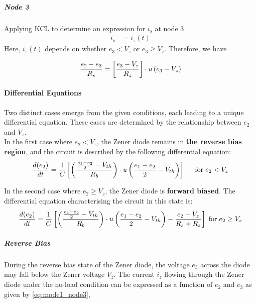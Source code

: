 \subparagraph{Node \textcircled{3}}
Applying KCL to determine an expression for $i_s$ at node \textcircled{3}
\begin{equation}
    \begin{split}
        i_s &= i_z(t)
    \end{split}
\end{equation}
Here, \(i_z(t)\) depends on whether \(e_3 < V_z\) or \(e_3 \geq V_z\). Therefore, we have

\begin{equation}
    \frac{e_2 - e_3}{R_s} = \left[\frac{e_3 - V_z}{R_z} \right]\cdot u\left(e_3 - V_z \right)
    \label{eq:mode1_node3}
\end{equation}

\paragraph{Differential Equations}
Two distinct cases emerge from the given conditions, each leading to a unique differential equation. These cases are determined by the relationship between \(e_2\) and \(V_z\).\\

In the first case where \(e_2 < V_z\), the Zener diode remains in \textbf{the reverse bias region}, and the circuit is described by the following differential equation:
\begin{equation}
    \frac{d(e_2)}{dt}=\frac{1}{C} \left[\left(\frac{\frac{e_1 - e_2}{2} - V_{th}}{R_b} \right) \cdot u\left(\frac{e_1-e_2}{2}-V_{th} \right) \right] \hspace{0.5cm} \text{for} \hspace{0.1cm} e_2 < V_z
\end{equation}

In the second case where \(e_2 \geq V_z\), the Zener diode is \textbf{forward biased}. The differential equation characterising the circuit in this state is:
\begin{equation}
   \frac{d(e_2)}{dt}=\frac{1}{C}\left[\left(\frac{\frac{e_1 - e_2}{2} - V_{th}}{R_b} \right)\cdot u\left(\frac{e_1 - e_2}{2} - V_{th} \right)-\frac{e_2-V_z}{R_s+R_z} \right] \hspace{0.1cm} \text{for} \hspace{0.1cm} e_2 \geq V_z
\end{equation}

\subparagraph{Reverse Bias}
During the reverse bias state of the Zener diode, the voltage $e_3$ across the diode may fall below the Zener voltage $V_z$. The current $i_z$ flowing through the Zener diode under the no-load condition can be expressed as a function of $e_2$ and $e_3$ as given by \eqref{eq:mode1_node3},

